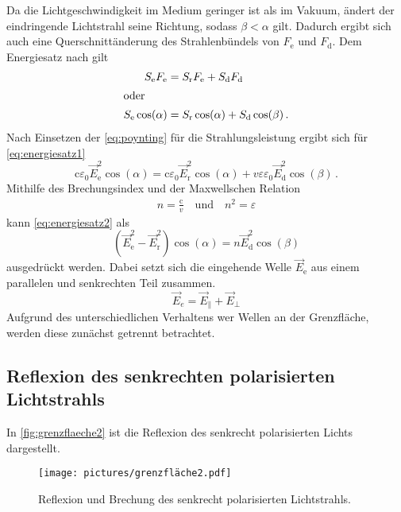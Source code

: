 Da die Lichtgeschwindigkeit im Medium geringer ist als im Vakuum,
ändert der eindringende Lichtstrahl seine Richtung, sodass $\beta < \alpha$ gilt.
Dadurch ergibt sich auch eine Querschnittänderung des Strahlenbündels von $F_\text{e}$ und $F_\text{d}$.
Dem Energiesatz nach gilt
\begin{align} \label{eq:energiesatz1}
    S_\text{e} F_\text{e} &= S_\text{r} F_\text{e} + S_\text{d} F_\text{d} \\
    \intertext{oder}
    S_\text{e} \cos(\alpha) &= S_\text{r} \cos(\alpha) + S_\text{d} \cos(\beta) \, .
\end{align}
Nach Einsetzen der \autoref{eq:poynting} für die Strahlungsleistung ergibt sich für \autoref{eq:energiesatz1} 
\begin{equation} \label{eq:energiesatz2}
    \text{c} \varepsilon_{0} \vec{E}_{\text{e}}^{2} \cos(\alpha) = \text{c} \varepsilon_{0} \vec{E}_{\text{r}}^{2} \cos(\alpha) + v \varepsilon \varepsilon_{0} \vec{E}_{\text{d}}^{2} \cos(\beta) \, .
\end{equation}
Mithilfe des Brechungsindex und der Maxwellschen Relation
\begin{align*}
    n = \frac{\text{c}}{v} \quad \text{und} \quad n^2 = \varepsilon
\end{align*}
kann \autoref{eq:energiesatz2} als
\begin{equation} \label{eq:energiesatz3}
    \left( \vec{E}_{\text{e}}^{2} - \vec{E}_{\text{r}}^{2} \right) \cos(\alpha) = n \vec{E}_{\text{d}}^{2} \cos(\beta)
\end{equation}  
ausgedrückt werden. 
Dabei setzt sich die eingehende Welle $\vec{E}_\text{e}$ aus einem parallelen und senkrechten Teil zusammen.
\begin{equation}
    \vec{E}_{e}=\vec{E}_{\|}+\vec{E}_{\perp}
\end{equation}
Aufgrund des unterschiedlichen Verhaltens wer Wellen an der Grenzfläche, werden diese zunächst getrennt betrachtet.


\subsection{Reflexion des senkrechten polarisierten Lichtstrahls}

In \autoref{fig:grenzflaeche2} ist die Reflexion des senkrecht polarisierten Lichts dargestellt.
\begin{figure}[ht]
    \centering
    \texttt{[image: pictures/grenzfläche2.pdf]}
    \caption{Reflexion und Brechung des senkrecht polarisierten Lichtstrahls. \cite{v407}}
    \label{fig:grenzflaeche2}
\end{figure}


